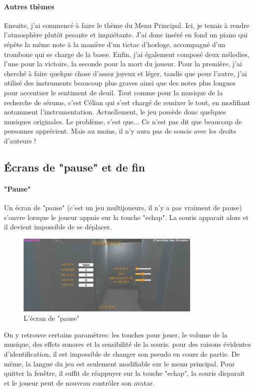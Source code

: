 \documentclass{article}
\begin{document}
\paragraph{Autres thèmes}
Ensuite, j'ai commencé à faire le thème du Menu Principal. Ici, je tenais à rendre l'atmosphère plutôt pesante et inquiétante. J'ai donc inséré en fond un piano qui répète la même note à la manière d'un tictac d'horloge, accompagné d'un trombone qui se charge de la basse. Enfin, j'ai également composé deux mélodies, l'une pour la victoire, la seconde pour la mort du joueur. Pour la première, j'ai cherché à faire quelque chose d'assez joyeux et léger, tandis que pour l'autre, j'ai utilisé des instruments beaucoup plus graves ainsi que des notes plus longues pour accentuer le sentiment de deuil. Tout comme pour la musique de la recherche de sérums, c'est Célian qui s'est chargé de remixer le tout, en modifiant notamment l'instrumentation. Actuellement, le jeu possède donc quelques musiques originales. Le problème, c'est que... Ce n'est pas dit que beaucoup de personnes apprécient. Mais au moins, il n'y aura pas de soucis avec les droits d'auteurs !


\subsection{Écrans de "pause" et de fin}
\paragraph{"Pause"}
Un écran de "pause" (c'est un jeu multijoueurs, il n'y a pas vraiment de pause) s'ouvre lorsque le joueur appuie sur la touche "echap". La souris apparait alors et il devient impossible de se déplacer.

\begin{figure}[H]
	\centering
	\includegraphics[width=0.8\textwidth]{Pause.png}
	\caption{L'écran de "pause"}
	\label{L'écran de "pause"}
\end{figure}


On y retrouve certains paramètres: les touches pour jouer, le volume de la musique, des effets sonores et la sensibilité de la souris. pour des raisons évidentes d'identification, il est impossible de changer son pseudo en cours de partie. De même, la langue du jeu est seulement modifiable sur le menu principal. Pour quitter la fenêtre, il suffit de réappuyer sur la touche "echap", la souris disparait et le joueur peut de nouveau contrôler son avatar.
\end{document}
